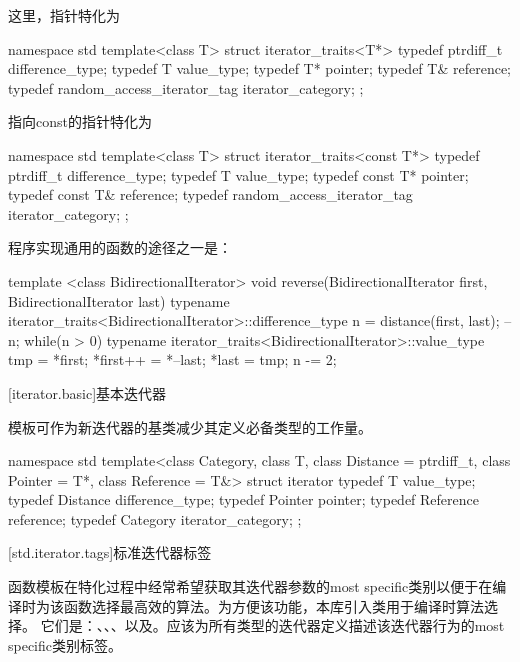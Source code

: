 \pnum
这里，指针特化为
\begin{codeblock}
namespace std {
  template<class T> struct iterator_traits<T*> {
    typedef ptrdiff_t difference_type;
    typedef T value_type;
    typedef T* pointer;
    typedef T& reference;
    typedef random_access_iterator_tag iterator_category;
  };
}
\end{codeblock}
指向const的指针特化为
\begin{codeblock}
namespace std {
  template<class T> struct iterator_traits<const T*> {
    typedef ptrdiff_t difference_type;
    typedef T value_type;
    typedef const T* pointer;
    typedef const T& reference;
    typedef random_access_iterator_tag iterator_category;
  };
}
\end{codeblock}

\pnum
\enterexample
\Cpp 程序实现通用的函数的途径之一是：
\begin{codeblock}
template <class BidirectionalIterator>
void reverse(BidirectionalIterator first, BidirectionalIterator last) {
  typename iterator_traits<BidirectionalIterator>::difference_type n =
    distance(first, last);
  --n;
  while(n > 0) {
    typename iterator_traits<BidirectionalIterator>::value_type
     tmp = *first;
    *first++ = *--last;
    *last = tmp;
    n -= 2;
  }
}
\end{codeblock}
\exitexample

[iterator.basic]{基本迭代器}

\pnum
{}模板可作为新迭代器的基类减少其定义必备类型的工作量。

\begin{codeblock}
namespace std {
  template<class Category, class T, class Distance = ptrdiff_t,
    class Pointer = T*, class Reference = T&>
  struct iterator {
    typedef T         value_type;
    typedef Distance  difference_type;
    typedef Pointer   pointer;
    typedef Reference reference;
    typedef Category  iterator_category;
  };
}
\end{codeblock}

[std.iterator.tags]{标准迭代器标签}

\pnum
{}%
%
%
%
%
函数模板在特化过程中经常希望获取其迭代器参数的most specific类别以便于在编译时为该函数选择最高效的算法。为方便该功能，本库引入类用于编译时算法选择。
它们是：、、、以及。应该为所有类型的迭代器定义描述该迭代器行为的most specific类别标签。

